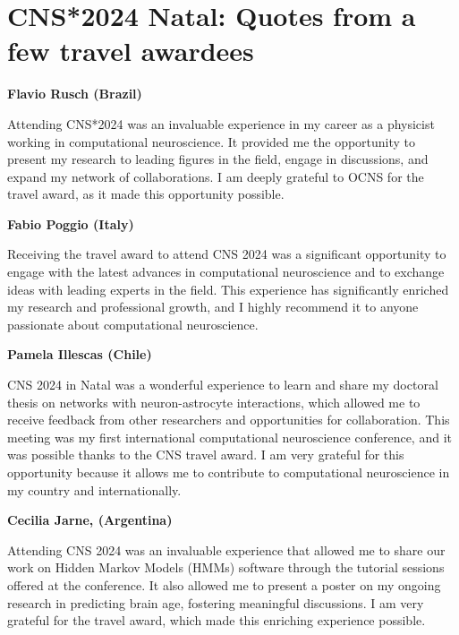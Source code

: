 \section*{CNS*2024 Natal: Quotes from a few travel awardees}%
\sectionauthor{\vspace{-4ex}}

\noindent{}\textbf{Flavio Rusch (Brazil)}
\begin{displayquote}
Attending CNS*2024 was an invaluable experience in my career as a physicist working in computational neuroscience. It provided me the opportunity to present my research to leading figures in the field, engage in discussions, and expand my network of collaborations. I am deeply grateful to OCNS for the travel award, as it made this opportunity possible.
\end{displayquote}

\vspace{2ex}
\noindent{}\textbf{Fabio Poggio (Italy)}
\begin{displayquote}
Receiving the travel award to attend CNS 2024 was a significant opportunity to engage with the latest advances in computational neuroscience and to exchange ideas with leading experts in the field. This experience has significantly enriched my research and professional growth, and I highly recommend it to anyone passionate about computational neuroscience.
\end{displayquote}

\vspace{2ex}
\noindent{}\textbf{Pamela Illescas (Chile)}
\begin{displayquote}
CNS 2024 in Natal was a wonderful experience to learn and share my doctoral thesis on networks with neuron-astrocyte interactions, which allowed
me to receive feedback from other researchers and opportunities for collaboration. This meeting was my first international computational neuroscience conference, and it was possible thanks to the CNS travel award. I am very grateful for this opportunity because it allows me to contribute to computational neuroscience in my country and internationally.
\end{displayquote}

\vspace{2ex}
\noindent{}\textbf{Cecilia Jarne, (Argentina)}
\begin{displayquote}
Attending CNS 2024 was an invaluable experience that allowed me to share our work on Hidden Markov Models (HMMs) software through the tutorial sessions offered at the conference. It also allowed me to present a poster on my ongoing research in predicting brain age, fostering meaningful discussions. I am very grateful for the travel award, which made this enriching experience possible.
\end{displayquote}

\fi{}

